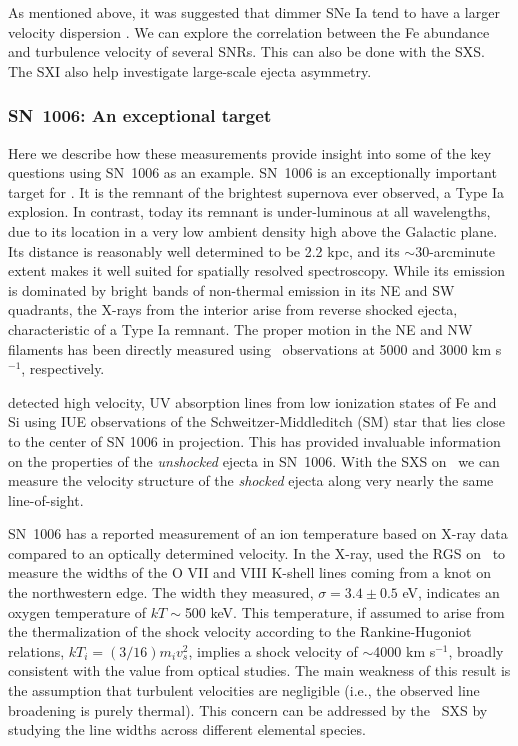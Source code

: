 \documentclass[11pt,a4paper]{article}
\begin{document}
{As mentioned above, it was suggested that dimmer SNe Ia tend to have a
larger velocity dispersion \citep{kasen09}.  We can explore the
correlation between the Fe abundance and turbulence velocity of
several SNRs.  This can also be done with the SXS. The SXI also help
investigate large-scale ejecta asymmetry.


\subsubsection{SN~1006: An exceptional target}

Here we describe how these measurements provide insight into some of
the key questions using SN~1006 as an example.  SN~1006 is an
exceptionally important target for \ah.  It is the remnant of the
brightest supernova ever observed, a Type Ia explosion.  In contrast,
today its remnant is under-luminous at all wavelengths, due to its
location in a very low ambient density high above the Galactic plane.
Its distance is reasonably well determined to be 2.2 kpc, and its
$\sim$30-arcminute extent makes it well suited for spatially resolved
spectroscopy.  While its emission is dominated by bright bands of
non-thermal emission in its NE and SW quadrants, the X-rays from the
interior arise from reverse shocked ejecta, characteristic of a Type
Ia remnant.  The proper motion in the NE and NW filaments has been
directly measured using \chandra\ observations at 5000 and 3000 km
s$^{-1}$, respectively.

\citet{wu83} detected high velocity, UV absorption lines from low
ionization states of Fe and Si using IUE observations of the
Schweitzer-Middleditch (SM) star that lies close to the center of SN
1006 in projection.  This has provided invaluable information on the
properties of the {\it unshocked} ejecta in SN~1006.  With the SXS on
\ah\ we can measure the velocity structure of the {\it shocked} ejecta
along very nearly the same line-of-sight.

SN~1006 has a reported measurement of an ion temperature based on
X-ray data compared to an optically determined velocity.  In the
X-ray, \cite{vink03} used the RGS on \xmm\ to measure the widths of
the O VII and VIII K-shell lines coming from a knot on the
northwestern edge.  The width they measured, $\sigma = 3.4 \pm 0.5$
eV, indicates an oxygen temperature of $kT\sim$500 keV. This
temperature, if assumed to arise from the thermalization of the shock
velocity according to the Rankine-Hugoniot relations, $kT_i =
(3/16)m_i v_s^2$, implies a shock velocity of $\sim$4000 km s$^{-1}$,
broadly consistent with the value from optical studies. The main
weakness of this result is the assumption that turbulent velocities
are negligible (i.e., the observed line broadening is purely thermal).
This concern can be addressed by the \ah\ SXS by studying the line
widths across different elemental species.

}
\end{document}
